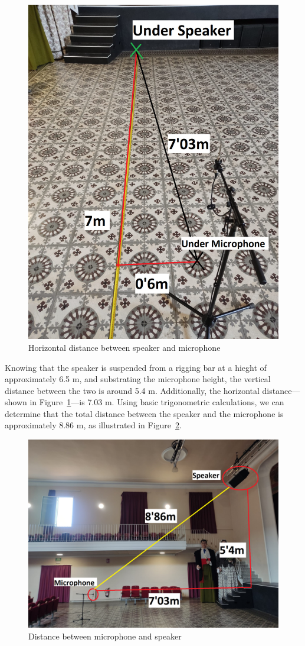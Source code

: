 \begin{figure}[H]
	\centering
	\includegraphics[width=0.8
	\linewidth]{Figures/Coro_floor_trigo.jpeg}
	\caption{Horizontal distance between speaker and microphone}
	\label{fig:Floor_section}
\end{figure}

Knowing that the speaker is suspended from a rigging bar at a hieght of approximately 6.5 m, and substrating the microphone height, the vertical distance between the two is around 5.4 m. Additionally, the horizontal distance—shown in Figure~\ref{fig:Floor_section}—is 7.03 m. Using basic trigonometric calculations, we can determine that the total distance between the speaker and the microphone is approximately 8.86 m, as illustrated in Figure~\ref{fig:spk-mic}.


\begin{figure}[H]
	\centering
	\includegraphics[width=0.8
	\linewidth]{Figures/Coro_section_trigo.jpeg}
	\caption{Distance between microphone and speaker}
	\label{fig:spk-mic}
\end{figure}

